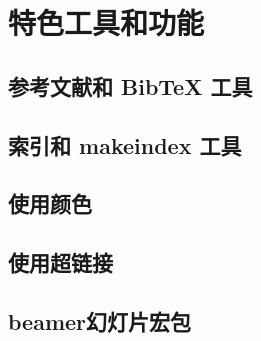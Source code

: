 \chapter{特色工具和功能}

\leavevmode\nobreakspace

\section{参考文献和 BibTeX 工具}

\leavevmode\nobreakspace

\section{索引和 makeindex 工具}

\leavevmode\nobreakspace

\section{使用颜色}

\leavevmode\nobreakspace

\section{使用超链接}

\leavevmode\nobreakspace

\section{\textsf{beamer}幻灯片宏包}

\leavevmode\nobreakspace

\endinput